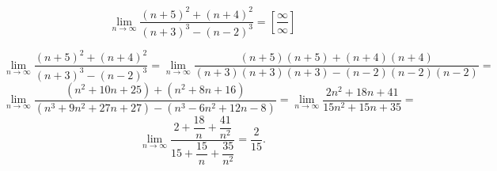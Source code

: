 {}

$$
  \lim_{n\to\infty} \dfrac{(n+5)^2+(n+4)^2}{(n+3)^3-(n-2)^3} = [ \dfrac{\infty}{\infty}]
$$

$$
  \lim_{n\to\infty} \dfrac{(n+5)^2+(n+4)^2}{(n+3)^3-(n-2)^3} =
  \lim_{n\to\infty} \dfrac{(n+5)(n+5)+(n+4)(n+4)}{(n+3)(n+3)(n+3)-(n-2)(n-2)(n-2)} =
$$
$$
  \lim_{n\to\infty} \dfrac{(n^2+10n+25)+(n^2+8n+16)}{(n^3+9n^2+27n+27)-(n^3-6n^2+12n-8)} =
  \lim_{n\to\infty} \dfrac{2n^2+18n+41}{15n^2+15n+35} =
$$
$$
  \lim_{n\to\infty} \dfrac{2+\dfrac{18}{n}+\dfrac{41}{n^2}}{15+\dfrac{15}{n}+\dfrac{35}{n^2}} =
  \dfrac{2}{15}.
$$

